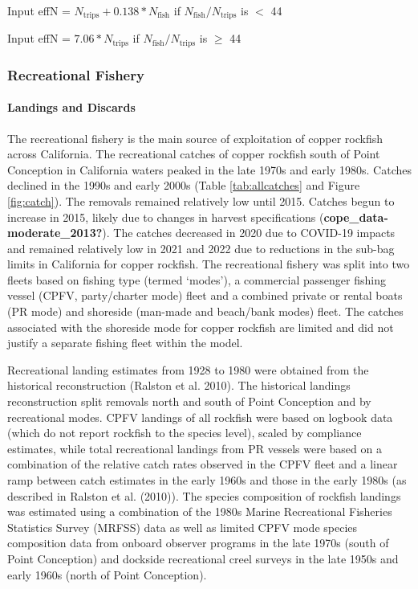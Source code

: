 \documentclass[11pt,
  english,
  letterpaper,
]{article}
\begin{document}
\begin{centering}

Input effN = $N_{\text{trips}} + 0.138 * N_{\text{fish}}$ if $N_{\text{fish}}/N_{\text{trips}}$ is $<$ 44

Input effN = $7.06 * N_{\text{trips}}$ if $N_{\text{fish}}/N_{\text{trips}}$ is $\geq$ 44

\end{centering}

\hypertarget{recreational-fishery}{%
\subsubsection{Recreational Fishery}\label{recreational-fishery}}

\hypertarget{landings-and-discards-1}{%
\paragraph{Landings and Discards}\label{landings-and-discards-1}}

\hfill\break

The recreational fishery is the main source of exploitation of copper rockfish across California. The recreational catches of copper rockfish south of Point Conception in California waters peaked in the late 1970s and early 1980s. Catches declined in the 1990s and early 2000s (Table \ref{tab:allcatches} and Figure \ref{fig:catch}). The removals remained relatively low until 2015. Catches begun to increase in 2015, likely due to changes in harvest specifications (\textbf{cope\_data-moderate\_2013?}). The catches decreased in 2020 due to COVID-19 impacts and remained relatively low in 2021 and 2022 due to reductions in the sub-bag limits in California for copper rockfish. The recreational fishery was split into two fleets based on fishing type (termed `modes'), a commercial passenger fishing vessel (CPFV, party/charter mode) fleet and a combined private or rental boats (PR mode) and shoreside (man-made and beach/bank modes) fleet. The catches associated with the shoreside mode for copper rockfish are limited and did not justify a separate fishing fleet within the model.

Recreational landing estimates from 1928 to 1980 were obtained from the historical reconstruction (Ralston et al. 2010). The historical landings reconstruction split removals north and south of Point Conception and by recreational modes. CPFV landings of all rockfish were based on logbook data (which do not report rockfish to the species level), scaled by compliance estimates, while total recreational landings from PR vessels were based on a combination of the relative catch rates observed in the CPFV fleet and a linear ramp between catch estimates in the early 1960s and those in the early 1980s (as described in Ralston et al. (2010)). The species composition of rockfish landings was estimated using a combination of the 1980s Marine Recreational Fisheries Statistics Survey (MRFSS) data as well as limited CPFV mode species composition data from onboard observer programs in the late 1970s (south of Point Conception) and dockside recreational creel surveys in the late 1950s and early 1960s (north of Point Conception).
\end{document}
